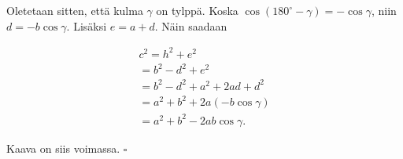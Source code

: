 Oletetaan sitten, että kulma $\gamma$ on tylppä. Koska $\cos (180^{\circ} - \gamma )
= - \cos \gamma$, niin $d = -b \cos \gamma$. Lisäksi $e = a + d$. Näin saadaan

\begin{align*}
c^2 = h^2 + e^2 \\
= b^2 - d^2 + e^2 \\
= b^2 - d^2 + a^2 + 2 a d + d^2 \\
= a^2 + b^2 + 2 a(- b \cos \gamma ) \\
= a^2 + b^2 - 2 a b \cos \gamma .
\end{align*}

Kaava on siis voimassa. $\square$